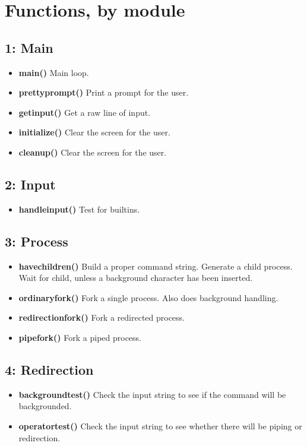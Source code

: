 \documentclass[letter,10pt]{article}
\begin{document}
\section*{Functions, by module}
    \subsection*{1: Main}
    \begin{itemize}
        \item \textbf{main()}
            Main loop.
        \item \textbf{prettyprompt()}
            Print a prompt for the user.
        \item \textbf{getinput()}
            Get a raw line of input.
        \item \textbf{initialize()}
            Clear the screen for the user.
        \item \textbf{cleanup()}
            Clear the screen for the user.
    \end{itemize}

    \subsection*{2: Input}
    \begin{itemize}
        \item \textbf{handleinput()}
            Test for builtins.
    \end{itemize}

    \subsection*{3: Process}
    \begin{itemize}
        \item \textbf{havechildren()}
            Build a proper command string.
            Generate a child process. 
            Wait for child, unless a background character has been inserted.
        \item \textbf{ordinaryfork()}
            Fork a single process. Also does background handling.
        \item \textbf{redirectionfork()}
            Fork a redirected process.
        \item \textbf{pipefork()}
            Fork a piped process.
    \end{itemize}


    \subsection*{4: Redirection}
    \begin{itemize}
        \item \textbf{backgroundtest()}
            Check the input string to see if the command will be backgrounded.
        \item \textbf{operatortest()}
            Check the input string to see whether there will be piping or redirection.
    \end{itemize}
\end{document}

